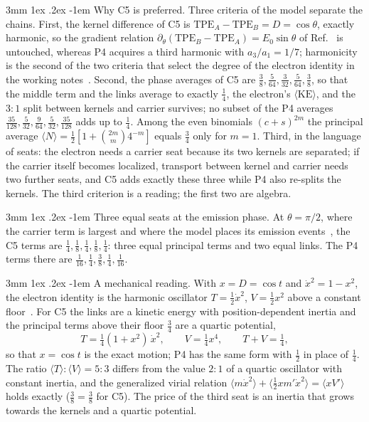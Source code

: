 \documentclass[%
 reprint, amsmath,amssymb, aps, prb, ]{revtex4-2}
\makeatletter
\numberwithin{equation}{section}
\renewcommand\paragraph{%
  \@startsection{paragraph}{4}{\z@}%
    {3mm \@plus 1ex \@minus .2ex}%
    {-1em}%
    {\normalfont\normalsize\itshape}}
\makeatother
\begin{document}
\paragraph{Why C5 is preferred.} Three criteria of the model separate the chains. First, the kernel difference of C5 is $\mathrm{TPE}_A-\mathrm{TPE}_B=D=\cos\theta$, exactly harmonic, so the gradient relation $\partial_\theta(\mathrm{TPE}_B-\mathrm{TPE}_A)=E_0\sin\theta$ of Ref.~\cite{ref:p1} is untouched, whereas P4 acquires a third harmonic with $a_3/a_1=1/7$; harmonicity is the second of the two criteria that select the degree of the electron identity in the working notes~\cite{ref:trunks}. Second, the phase averages of C5 are $\frac38,\frac{5}{64},\frac{3}{32},\frac{5}{64},\frac38$, so that the middle term and the links average to exactly $\frac14$, the electron's $\langle\mathrm{KE}\rangle$, and the $3{:}1$ split between kernels and carrier survives; no subset of the P4 averages $\frac{35}{128},\frac{5}{32},\frac{9}{64},\frac{5}{32},\frac{35}{128}$ adds up to $\frac14$. Among the even binomials $(c+s)^{2m}$ the principal average $\langle N\rangle=\frac12[1+\binom{2m}{m}4^{-m}]$ equals $\frac34$ only for $m=1$. Third, in the language of seats: the electron needs a carrier seat because its two kernels are separated; if the carrier itself becomes localized, transport between kernel and carrier needs two further seats, and C5 adds exactly these three while P4 also re-splits the kernels. The third criterion is a reading; the first two are algebra.

\paragraph{Three equal seats at the emission phase.} At $\theta=\pi/2$, where the carrier term is largest and where the model places its emission events~\cite{ref:p58}, the C5 terms are $\frac14,\frac18,\frac14,\frac18,\frac14$: three equal principal terms and two equal links. The P4 terms there are $\frac{1}{16},\frac14,\frac38,\frac14,\frac{1}{16}$.

\paragraph{A mechanical reading.} With $x=D=\cos t$ and $\dot x^2=1-x^2$, the electron identity is the harmonic oscillator $T=\frac12\dot x^2$, $V=\frac12x^2$ above a constant floor~\cite{ref:p46}. For C5 the links are a kinetic energy with position-dependent inertia and the principal terms above their floor $\frac34$ are a quartic potential,
\begin{equation}
T=\tfrac14(1+x^2)\,\dot x^2,\qquad V=\tfrac14x^4,\qquad T+V=\tfrac14,
\label{eq:mech}
\end{equation}
so that $x=\cos t$ is the exact motion; P4 has the same form with $\frac12$ in place of $\frac14$. The ratio $\langle T\rangle:\langle V\rangle=5:3$ differs from the value $2:1$ of a quartic oscillator with constant inertia, and the generalized virial relation $\langle m\dot x^2\rangle+\langle\frac12xm'\dot x^2\rangle=\langle xV'\rangle$ holds exactly ($\frac38=\frac38$ for C5). The price of the third seat is an inertia that grows towards the kernels and a quartic potential.
\end{document}
